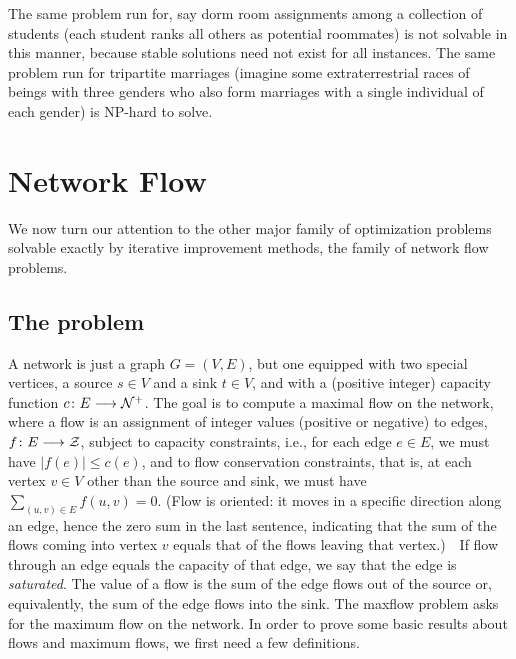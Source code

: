 \documentclass[11pt]{article}
\begin{document}
The same problem run for, say dorm room assignments among a collection of
students (each student ranks all others as potential roommates)
is not solvable in this manner, because stable solutions need not exist
for all instances.  The same problem run for tripartite marriages (imagine
some extraterrestrial races of beings with three genders who also form marriages
with a single individual of each gender) is NP-hard to solve.

\section{Network Flow}
We now turn our attention to the other major family of optimization problems
solvable exactly by iterative improvement methods, the family of network
flow problems.

\subsection{The problem}
A network is just a graph $G=(V,E)$, but one equipped with two special
vertices, a source $s\in V$ and a sink $t\in V$, and with a (positive
integer) capacity function
$c\colon E\longrightarrow \cal{N}^{+}$.   The goal is to compute a maximal
flow on the network, where a flow is an assignment of integer values (positive
or negative) to edges, $f\colon E\longrightarrow \cal{Z}$, subject to capacity
constraints, i.e., for each edge $e\in E$, we must have $|f(e)|\leq c(e)$, and
to flow conservation constraints, that is,  at each vertex $v\in V$ other
than the source and sink, we must have $\sum_{(u,v)\in E} f(u,v)=0$.  (Flow
is oriented: it moves in a specific direction along an edge, hence the zero sum
in the last sentence, indicating that the sum of the flows coming into
vertex $v$ equals that of the flows leaving that vertex.)\ \ 
If flow through an edge equals the capacity of that edge, we say that the
edge is \emph{saturated}.
The value of a flow is the sum of the edge flows out of the source or,
equivalently, the sum of the edge flows into the sink.
The maxflow problem asks for the maximum flow on the network.
In order to prove some basic results about flows and maximum flows, we
first need a few definitions.
\end{document}
